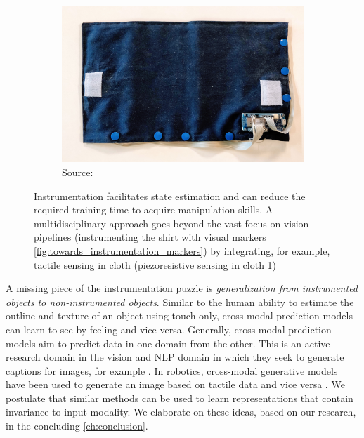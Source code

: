 \documentclass[\home/main.tex]{subfiles}
\begin{document}
\begin{figure}[htpb]{}
    \begin{subfigure}[b]{0.90\textwidth}
        \includegraphics[width=\linewidth,keepaspectratio]{figures/instrumentation_piezoresistive}
        \caption{Source: \autocite{Verleysen2020-folding}}
        \label{fig:towards_instrumentation_piezoresistive}
    \end{subfigure}
    \caption[Visual vs. electrical instrumentation.]{Instrumentation facilitates state estimation and can reduce the required training time to acquire manipulation skills. A multidisciplinary approach goes beyond the vast focus on vision pipelines (instrumenting the shirt with visual markers \cref{fig:towards_instrumentation_markers}) by integrating, for example, tactile sensing in cloth (piezoresistive sensing in cloth \cref{fig:towards_instrumentation_piezoresistive})}
    \label{fig:towards_instrumentation}
\end{figure}

A missing piece of the instrumentation puzzle is \emph{generalization from instrumented objects to non-instrumented objects}. Similar to the human ability to estimate the outline and texture of an object using touch only, cross-modal prediction models can learn to see by feeling and vice versa. Generally, cross-modal prediction models aim to predict data in one domain from the other. This is an active research domain in the vision and NLP domain in which they seek to generate captions for images, for example \autocite{donahue2015long}. In robotics, cross-modal generative models have been used to generate an image based on tactile data and vice versa \autocite{Li2019}. We postulate that similar methods can be used to learn representations that contain invariance to input modality. We elaborate on these ideas, based on our research, in the concluding \cref{ch:conclusion}.
\end{document}
